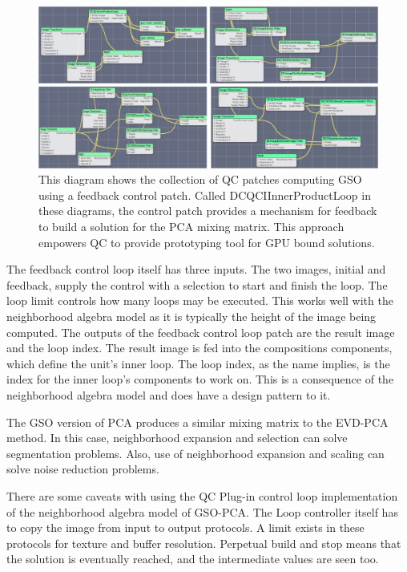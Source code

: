 \documentclass[11pt]{article}
\begin{document}
\begin{figure}[htbp] %
   \centering
   \includegraphics[width=6in]{controlLoopGSO.jpg} 
   \caption{This diagram shows the collection of QC patches computing GSO using a feedback control patch.  Called DCQCIInnerProductLoop in these diagrams, the control patch provides a mechanism for feedback to build a solution for the PCA mixing matrix.  This approach empowers QC to provide prototyping tool for GPU bound solutions.}
   \label{controlLoopGSO}
\end{figure}

The feedback control loop itself has three inputs.  The two images, initial and feedback, supply the control with a selection to start and finish the loop.  The loop limit controls how many loops may be executed.  This works well with the neighborhood algebra model as it is typically the height of the image being computed.  The outputs of the feedback control loop patch are the result image and the loop index.  The result image is fed into the compositions components, which define the unit's inner loop.  The loop index, as the name implies, is the index for the inner loop's components to work on.   This is a consequence of the neighborhood algebra model and does have a design pattern to it.  
	
The GSO version of PCA produces a similar mixing matrix to the EVD-PCA method.  In this case, neighborhood expansion and selection can solve segmentation problems.  Also, use of neighborhood expansion and scaling can solve noise reduction problems. 
	
There are some caveats with using the QC Plug-in control loop implementation of the neighborhood algebra model of GSO-PCA. The Loop controller itself has to copy the image from input to output protocols.  A limit exists in these protocols for texture and buffer resolution. 
Perpetual build and stop means that the solution is eventually reached, and the intermediate values are seen too.  
\end{document}
